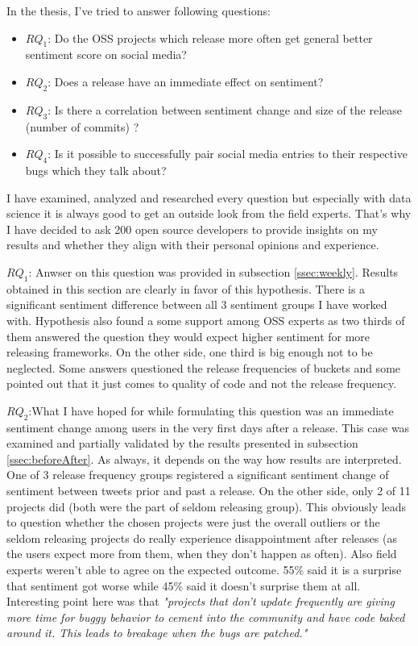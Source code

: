 
In the thesis, I've tried to answer following questions:
\begin{itemize}
\item{\textbf{$RQ_{1}$}: Do the OSS projects which release more often get general better sentiment score on social media?}
\item{\textbf{$RQ_{2}$}: Does a release have an immediate effect on sentiment?}
\item{\textbf{$RQ_{3}$}: Is there a correlation between sentiment change and size of the release (number of commits) ?}
\item{\textbf{$RQ_{4}$}: Is it possible to successfully pair social media entries to their respective bugs which they talk about?}
\end{itemize}

I have examined, analyzed and researched every question but especially with data science it is always good to get an outside look from the field experts. That's why I have decided to ask 200 open source developers to provide insights on my results and whether they align with their personal opinions and experience.

\textbf{$RQ_{1}$}: Anwser on this question was provided in subsection  \ref{ssec:weekly}. Results obtained in this section are clearly in favor of this hypothesis. There is a significant sentiment difference between all 3 sentiment groups I have worked with. Hypothesis also found a some support among OSS experts as two thirds of them answered the question they would expect higher sentiment for more releasing frameworks. On the other side, one third is big enough not to be neglected. Some answers questioned the release frequencies of buckets and some pointed out that it just comes to quality of code and not the release frequency.

\textbf{$RQ_{2}$}:What I have hoped for while formulating this question was an immediate sentiment change among users in the very first days after a release. This case was examined and partially validated by the results presented in subsection \ref{ssec:beforeAfter}. As always, it depends on the way how results are interpreted. One of 3 release frequency groups registered a significant sentiment change of sentiment between tweets prior and past a release. On the other side, only 2 of 11 projects did (both were the part of seldom releasing group). This obviously leads to question whether the chosen projects were just the overall outliers or the seldom releasing projects do really experience disappointment after releases (as the users expect more from them, when they don't happen as often). Also field experts weren't able to agree on the expected outcome. 55\% said  it is a surprise that sentiment got worse while 45\% said it doesn't surprise them at all. Interesting point here was that \textit{"projects that don't update frequently are giving more time for buggy behavior to cement into the community and have code baked around it. This leads to breakage when the bugs are patched."}

